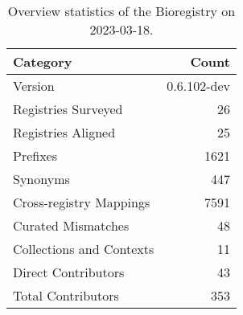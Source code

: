 \begin{table}
\centering
\caption{Overview statistics of the Bioregistry on 2023-03-18.}
\label{tab:bioregistry-summary}
\begin{tabular}{lr}
\toprule
                Category &       Count \\
\midrule
                 Version & 0.6.102-dev \\
     Registries Surveyed &          26 \\
      Registries Aligned &          25 \\
                Prefixes &        1621 \\
                Synonyms &         447 \\
 Cross-registry Mappings &        7591 \\
      Curated Mismatches &          48 \\
Collections and Contexts &          11 \\
     Direct Contributors &          43 \\
      Total Contributors &         353 \\
\bottomrule
\end{tabular}
\end{table}
